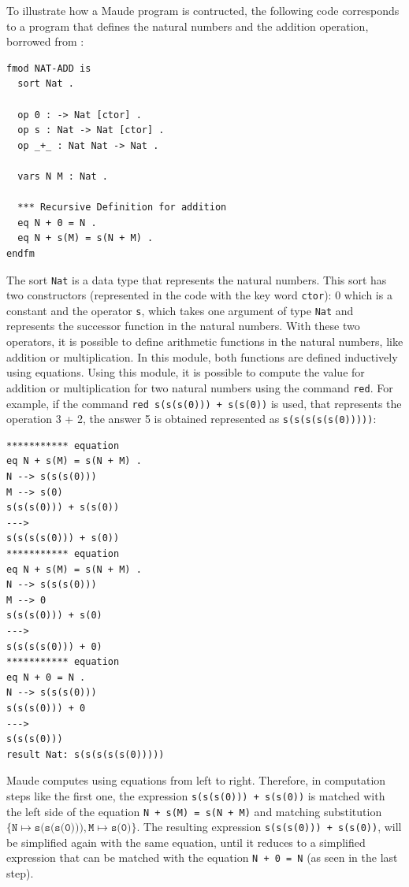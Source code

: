 To illustrate how a Maude program is contructed, the following code corresponds to a program that defines the natural numbers and the addition operation, borrowed from \cite{PeterMaude}: 
\begin{lstlisting}
fmod NAT-ADD is
  sort Nat .

  op 0 : -> Nat [ctor] .
  op s : Nat -> Nat [ctor] .
  op _+_ : Nat Nat -> Nat .

  vars N M : Nat .
    
  *** Recursive Definition for addition
  eq N + 0 = N .
  eq N + s(M) = s(N + M) .
endfm
\end{lstlisting}
The sort \texttt{Nat} is a data type that represents the natural numbers. This sort has two constructors (represented in the code with the key word \texttt{ctor}): 0 which is a constant and the operator \texttt{s}, which takes one argument of type \texttt{Nat} and represents the successor function in the natural numbers. With these two operators, it is possible to define arithmetic functions in the natural numbers, like addition or multiplication. In this module, both functions are defined inductively using equations. Using this module, it is possible to compute the value for addition or multiplication for two natural numbers using the command \texttt{red}. For example, if the command \texttt{red s(s(s(0))) + s(s(0))} is used, that represents the operation 3 + 2, the answer 5 is obtained represented as \texttt{s(s(s(s(s(0)))))}:
\begin{lstlisting}
*********** equation
eq N + s(M) = s(N + M) .
N --> s(s(s(0)))
M --> s(0)
s(s(s(0))) + s(s(0))
--->
s(s(s(s(0))) + s(0))
*********** equation
eq N + s(M) = s(N + M) .
N --> s(s(s(0)))
M --> 0
s(s(s(0))) + s(0)
--->
s(s(s(s(0))) + 0)
*********** equation
eq N + 0 = N .
N --> s(s(s(0)))
s(s(s(0))) + 0
--->
s(s(s(0)))
result Nat: s(s(s(s(s(0)))))
\end{lstlisting}
Maude computes using equations from left to right. Therefore, in computation steps like the first one, the expression \texttt{s(s(s(0))) + s(s(0))} is matched with the left side of the equation \texttt{N + s(M) = s(N + M)} and matching substitution $\{\texttt{N} \mapsto \texttt{s(s(s(0)))},\texttt{M} \mapsto \texttt{s(0)} \}$. The resulting expression \texttt{s(s(s(0))) + s(s(0))}, will be simplified again with the same equation, until it reduces to a simplified expression that can be matched with the equation \texttt{N + 0 = N} (as seen in the last step).

